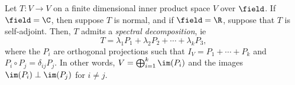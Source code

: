 \begin{theorem}\label{thm:spectral}
    Let $T : V \to V$ on a finite dimensional inner product space $V$ over $\field$. If $\field = \C$, then suppose $T$ is normal, and if $\field = \R$, suppose that $T$ is self-adjoint. Then, $T$ admits a \emph{spectral decomposition}, ie \[
    T = \lambda_1 P_1 + \lambda_2 P_2 + \cdots + \lambda_k P_3,
    \]
    where the $P_i$ are orthogonal projections such that $I_V = P_1 + \cdots + P_k$ and $P_i \circ P_j = \delta_{ij} P_{j}$. In other words, $V = \bigoplus_{i=1}^k \im(P_i)$ and the images $\im(P_i) \perp \im(P_j)$ for $i \neq j$.
\end{theorem}